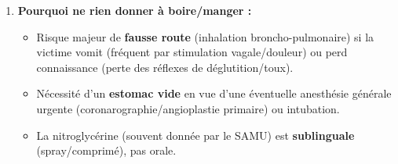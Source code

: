 \documentclass[11pt]{article}
\begin{document}
\begin{corrige}
\begin{enumerate}
\begin{enumerate}
    \end{enumerate}
    \item \textbf{Pourquoi ne rien donner à boire/manger :}
    \begin{itemize}
        \item Risque majeur de \textbf{fausse route} (inhalation broncho-pulmonaire) si la victime vomit (fréquent par stimulation vagale/douleur) ou perd connaissance (perte des réflexes de déglutition/toux).
        \item Nécessité d'un \textbf{estomac vide} en vue d'une éventuelle anesthésie générale urgente (coronarographie/angioplastie primaire) ou intubation.
        \item La nitroglycérine (souvent donnée par le SAMU) est \textbf{sublinguale} (spray/comprimé), pas orale.
    \end{itemize}
\end{enumerate}
\end{corrige}
\end{document}
